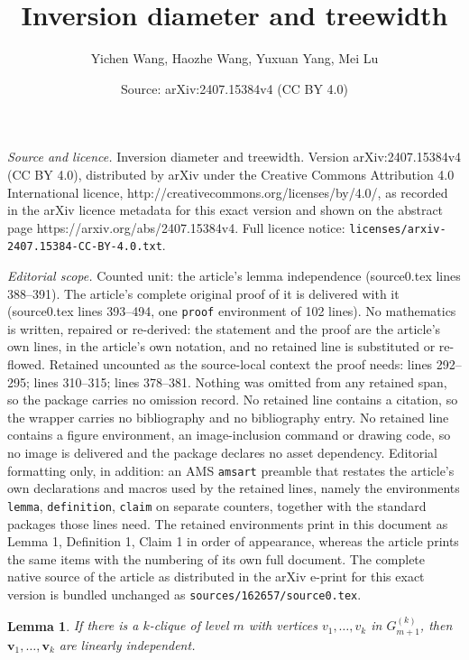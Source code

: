 \documentclass[10pt,a4paper]{amsart}
\title{Inversion diameter and treewidth}
\author{Yichen Wang, Haozhe Wang, Yuxuan Yang, Mei Lu}
\date{Source: arXiv:2407.15384v4 (CC BY 4.0)}
\newtheorem{lemma}{Lemma}
\begin{document}
\maketitle

\noindent\emph{Source and licence.} Inversion diameter and treewidth. Version arXiv:2407.15384v4 (CC BY 4.0), distributed by arXiv under the Creative Commons Attribution 4.0 International licence, http://creativecommons.org/licenses/by/4.0/, as recorded in the arXiv licence metadata for this exact version and shown on the abstract page https://arxiv.org/abs/2407.15384v4. Full licence notice: \texttt{licenses/arxiv-2407.15384-CC-BY-4.0.txt}.\par\smallskip

\noindent\textit{Editorial scope.} Counted unit: the article's lemma independence (source0.tex lines 388--391). The article's complete original proof of it is delivered with it (source0.tex lines 393--494, one \texttt{proof} environment of 102 lines). No mathematics is written, repaired or re-derived: the statement and the proof are the article's own lines, in the article's own notation, and no retained line is substituted or re-flowed.  Retained uncounted as the source-local context the proof needs: lines 292--295; lines 310--315; lines 378--381.  Nothing was omitted from any retained span, so the package carries no omission record.  No retained line contains a citation, so the wrapper carries no bibliography and no bibliography entry.  No retained line contains a figure environment, an image-inclusion command or drawing code, so no image is delivered and the package declares no asset dependency.  Editorial formatting only, in addition: an AMS \texttt{amsart} preamble that restates the article's own declarations and macros used by the retained lines, namely the environments \texttt{lemma}, \texttt{definition}, \texttt{claim} on separate counters, together with the standard packages those lines need.  The retained environments print in this document as Lemma 1, Definition 1, Claim 1 in order of appearance, whereas the article prints the same items with the numbering of its own full document.  The complete native source of the article as distributed in the arXiv e-print for this exact version is bundled unchanged as \texttt{sources/162657/source0.tex}.
\begin{lemma}\label{lemma: clique independence}
    If there is a $k$-clique of level $m$ with vertices $v_1, \ldots, v_k$ in $G^{(k)}_{m+1}$, then $\mathbf{v}_1, \ldots, \mathbf{v}_k$ are linearly independent.
\end{lemma}
\end{document}
